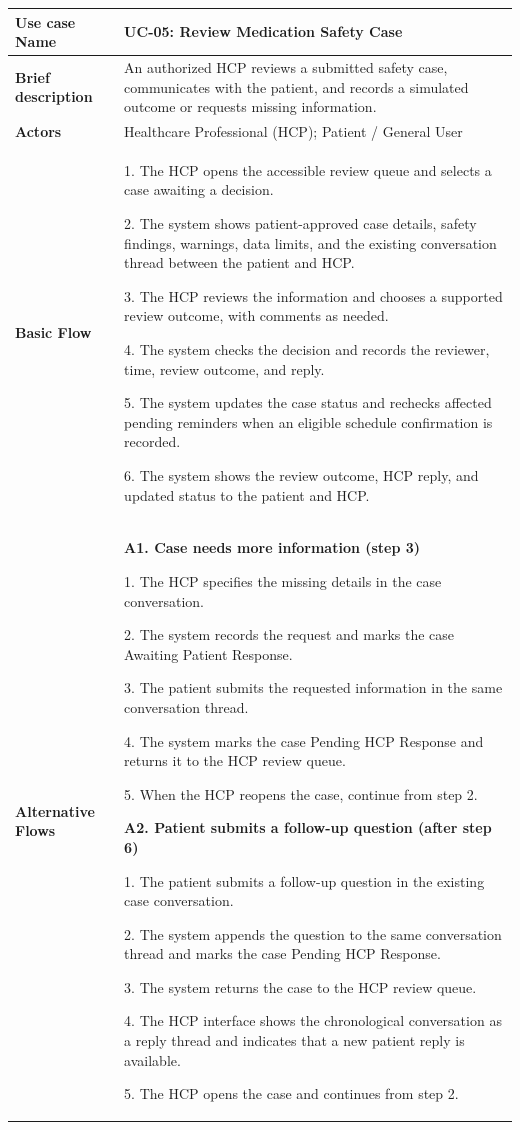 \begin{longtable}{|p{}|p{}|}
\hline
\textbf{Use case Name} & UC-05: Review Medication Safety Case \\ \hline

\textbf{Brief description} &
An authorized HCP reviews a submitted safety case, communicates with the patient, and records a simulated outcome or requests missing information.
\\ \hline

\textbf{Actors} &
Healthcare Professional (HCP); Patient / General User
\\ \hline

\textbf{Basic Flow} &
1. The HCP opens the accessible review queue and selects a case awaiting a decision.\par
2. The system shows patient-approved case details, safety findings, warnings, data limits, and the existing conversation thread between the patient and HCP.\par
3. The HCP reviews the information and chooses a supported review outcome, with comments as needed.\par
4. The system checks the decision and records the reviewer, time, review outcome, and reply.\par
5. The system updates the case status and rechecks affected pending reminders when an eligible schedule confirmation is recorded.\par
6. The system shows the review outcome, HCP reply, and updated status to the patient and HCP.
\\ \hline

\textbf{Alternative Flows} &

\textbf{A1. Case needs more information (step 3)}\par
1. The HCP specifies the missing details in the case conversation.\par
2. The system records the request and marks the case Awaiting Patient Response.\par
3. The patient submits the requested information in the same conversation thread.\par
4. The system marks the case Pending HCP Response and returns it to the HCP review queue.\par
5. When the HCP reopens the case, continue from step 2.

\par\smallskip

\textbf{A2. Patient submits a follow-up question (after step 6)}\par
1. The patient submits a follow-up question in the existing case conversation.\par
2. The system appends the question to the same conversation thread and marks the case Pending HCP Response.\par
3. The system returns the case to the HCP review queue.\par
4. The HCP interface shows the chronological conversation as a reply thread and indicates that a new patient reply is available.\par
5. The HCP opens the case and continues from step 2.


\end{longtable}
